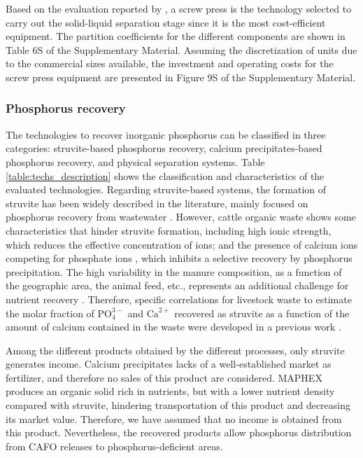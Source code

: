 \documentclass[authoryear]{elsarticle}
\begin{document}
Based on the evaluation reported by \citet{MollerSLsep}, a screw press is the technology selected to carry out the solid-liquid separation stage since it is the most cost-efficient
equipment. The partition coefficients for the different components are shown in Table 6S of the Supplementary Material. Assuming the discretization of units due to the commercial sizes available, the investment and operating costs for the screw press equipment are presented in Figure 9S of the Supplementary Material.

\subsubsection{Phosphorus recovery}
The technologies to recover inorganic phosphorus can be classified in three categories: struvite-based phosphorus recovery, calcium precipitates-based phosphorus recovery, and physical separation systems. Table \ref{table:techs_description} shows the classification and characteristics of the evaluated technologies. Regarding struvite-based systems, the formation of struvite has been widely described in the  literature, mainly focused on phosphorus recovery from wastewater \citep{rahaman_modeling_2014, Battistoni}. 
However, cattle organic waste shows some characteristics that hinder struvite formation, including high ionic strength, which reduces the effective concentration of ions; and the presence of calcium ions competing for phosphate ions \citep{Yan2016}, which inhibits a selective recovery by phosphorus precipitation. The high variability in the manure composition, as a function of the geographic area, the animal feed, etc., represents an additional challenge for nutrient recovery \citep{Tao}. Therefore, specific correlations for livestock waste to estimate the molar fraction of $\text{PO}_{4}^{3-}$ and $\text{Ca}^{2+}$ recovered as struvite as a function of the amount of calcium contained in the waste were developed in a previous work \citep{MartinStruvite}. 

Among the different products obtained by the different processes, only struvite generates income. Calcium precipitates lacks of a well-established market as fertilizer, and therefore no sales of this product are considered. MAPHEX produces an organic solid rich in nutrients, but with a lower nutrient density compared with struvite, hindering transportation of this product and decreasing its market value. Therefore, we have assumed that no income is obtained from this product. Nevertheless, the recovered products allow phosphorus distribution from CAFO releases to phosphorus-deficient areas.
\end{document}
